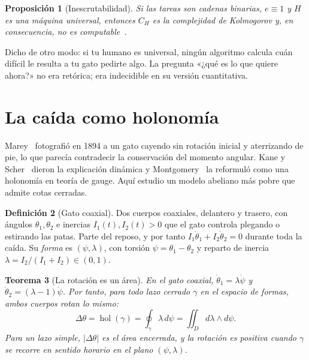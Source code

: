 \documentclass[11pt,a4paper]{article}
\theoremstyle{plain}
\newtheorem{teorema}{Teorema}[section]
\newtheorem{proposicion}[teorema]{Proposición}
\theoremstyle{definition}
\newtheorem{definicion}[teorema]{Definición}
\theoremstyle{remark}
\numberwithin{equation}{section}
\DeclareMathOperator{\hol}{hol}
\newcommand{\cg}{C}
\begin{document}
\begin{proposicion}[Inescrutabilidad]\label{prop:noComputable}
Si las tareas son cadenas binarias, $e\equiv 1$ y $H$ es una máquina universal, entonces $\cg_H$ es la complejidad de Kolmogorov y, en consecuencia, no es computable~\cite{livitanyi}.
\end{proposicion}

Dicho de otro modo: si tu humano es universal, ningún algoritmo calcula cuán difícil le resulta a tu gato pedirte algo. La pregunta «¿qué es lo que quiere ahora?» no era retórica; era indecidible en su versión cuantitativa.

\section{La caída como holonomía}\label{sec:caida}

Marey~\cite{marey,marey-nature} fotografió en 1894 a un gato cayendo sin rotación inicial y aterrizando de pie, lo que parecía contradecir la conservación del momento angular. Kane y Scher~\cite{kanescher} dieron la explicación dinámica y Montgomery~\cite{montgomery} la reformuló como una holonomía en teoría de gauge. Aquí estudio un modelo abeliano más pobre que admite cotas cerradas.

\begin{definicion}[Gato coaxial]
Dos cuerpos coaxiales, delantero y trasero, con ángulos $\theta_1,\theta_2$ e inercias $I_1(t),I_2(t)>0$ que el gato controla plegando o estirando las patas. Parte del reposo, y por tanto $I_1\dot\theta_1+I_2\dot\theta_2=0$ durante toda la caída. Su \emph{forma} es $(\psi,\lambda)$, con torsión $\psi=\theta_1-\theta_2$ y reparto de inercia $\lambda=I_2/(I_1+I_2)\in(0,1)$.
\end{definicion}

\begin{teorema}[La rotación es un área]\label{teo:holonomia}
En el gato coaxial, $\dot\theta_1=\lambda\dot\psi$ y $\dot\theta_2=(\lambda-1)\dot\psi$. Por tanto, para todo lazo cerrado $\gamma$ en el espacio de formas, ambos cuerpos rotan lo mismo:
\begin{equation}
  \Delta\theta=\hol(\gamma)=\oint_\gamma\lambda\,d\psi=\iint_{D}d\lambda\wedge d\psi .
\end{equation}
Para un lazo simple, $|\Delta\theta|$ es el área encerrada, y la rotación es positiva cuando $\gamma$ se recorre en sentido horario en el plano $(\psi,\lambda)$.
\end{teorema}
\end{document}

